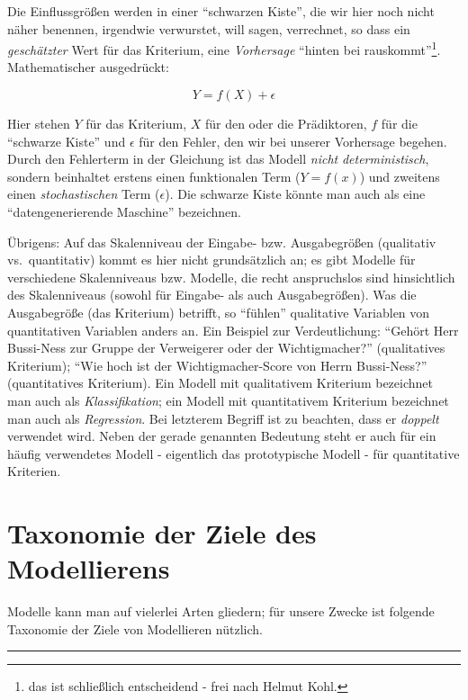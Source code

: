 \documentclass[12pt,ngerman,]{book}
\let\rmarkdownfootnote\footnote%
\def\footnote{\protect\rmarkdownfootnote}
\begin{document}
Die Einflussgrößen werden in einer ``schwarzen Kiste'', die wir hier
noch nicht näher benennen, irgendwie verwurstet, will sagen, verrechnet,
so dass ein \emph{geschätzter} Wert für das Kriterium, eine
\emph{Vorhersage} ``hinten bei rauskommt''\footnote{das ist schließlich
  entscheidend - frei nach Helmut Kohl.}. Mathematischer ausgedrückt:

\[Y = f(X) + \epsilon\]

Hier stehen \(Y\) für das Kriterium, \(X\) für den oder die Prädiktoren,
\(f\) für die ``schwarze Kiste'' und \(\epsilon\) für den Fehler, den
wir bei unserer Vorhersage begehen. Durch den Fehlerterm in der
Gleichung ist das Modell \emph{nicht}
\emph{deterministisch}, sondern beinhaltet
erstens einen funktionalen Term (\(Y=f(x)\)) und zweitens einen
\emph{stochastischen} Term (\(\epsilon\)). Die schwarze Kiste könnte man
auch als eine ``datengenerierende Maschine'' bezeichnen.

Übrigens: Auf das Skalenniveau der Eingabe- bzw. Ausgabegrößen
(qualitativ vs.~quantitativ) kommt es hier nicht grundsätzlich an; es
gibt Modelle für verschiedene Skalenniveaus bzw. Modelle, die recht
anspruchslos sind hinsichtlich des Skalenniveaus (sowohl für Eingabe-
als auch Ausgabegrößen). Was die Ausgabegröße (das Kriterium) betrifft,
so ``fühlen'' qualitative Variablen von quantitativen Variablen anders
an. Ein Beispiel zur Verdeutlichung: ``Gehört Herr Bussi-Ness zur Gruppe
der Verweigerer oder der Wichtigmacher?'' (qualitatives Kriterium);
``Wie hoch ist der Wichtigmacher-Score von Herrn Bussi-Ness?''
(quantitatives Kriterium). Ein Modell mit qualitativem Kriterium
bezeichnet man auch als \emph{Klassifikation}; ein
Modell mit quantitativem Kriterium bezeichnet man auch als
\emph{Regression}. Bei letzterem Begriff ist zu
beachten, dass er \emph{doppelt} verwendet wird. Neben der gerade
genannten Bedeutung steht er auch für ein häufig verwendetes Modell -
eigentlich das prototypische Modell - für quantitative Kriterien.

\section{Taxonomie der Ziele des Modellierens}\label{Ziele}

Modelle kann man auf vielerlei Arten gliedern; für unsere Zwecke ist
folgende Taxonomie der Ziele von Modellieren nützlich.

\begin{center}\rule{0.5\linewidth}{\linethickness}\end{center}
\end{document}
